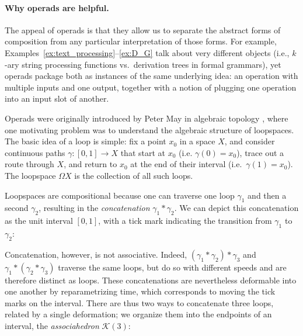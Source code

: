 \documentclass{article}
\theoremstyle{plain}
\theoremstyle{definition}
\theoremstyle{remark}
\theoremstyle{definition}
\newcommand\cK{\mathcal{K}}
\begin{document}
\paragraph{Why operads are helpful.}

The appeal of operads is that they allow us to separate the abstract forms of composition from any particular interpretation of those forms.
For example, Examples~\ref{ex:text_processing}--\ref{ex:D_G} talk about very different objects (i.e., $k$-ary string processing functions vs.\ derivation trees in formal grammars), yet operads package both as instances of the same underlying idea: an operation with multiple inputs and one output, together with a notion of plugging one operation into an input slot of another.

Operads were originally introduced by Peter May in algebraic topology \citep{may:recognition}, where one motivating problem was to understand the algebraic structure of loopspaces.
The basic idea of a loop is simple: fix a point $x_0$ in a space $X$, and consider continuous paths $\gamma\colon [0,1] \to X$ that start at $x_0$ (i.e. $\gamma(0)=x_0$), trace out a route through $X$, and return to $x_0$ at the end of their interval (i.e.\ $\gamma(1)=x_0$).
The loopspace $\Omega X$ is the collection of all such loops.

Loopspaces are compositional because one can traverse one loop $\gamma_1$ and then a second $\gamma_2$, resulting in the \emph{concatenation} $\gamma_1*\gamma_2$.
We can depict this concatenation as the unit interval $[0,1]$, with a tick mark indicating the transition from $\gamma_1$ to $\gamma_2$: \hspace{1.0em}

Concatenation, however, is not associative.
Indeed, $(\gamma_1 * \gamma_2) * \gamma_3$ and $\gamma_1 * (\gamma_2 * \gamma_3)$ traverse the same loops, but do so with different speeds and are therefore distinct as loops.
These concatenations are nevertheless deformable into one another by reparametrizing time, which corresponds to moving the tick marks on the interval.
There are thus two ways to concatenate three loops, related by a single deformation; we organize them into the endpoints of an interval, the \emph{associahedron} $\cK(3)$:
\end{document}
